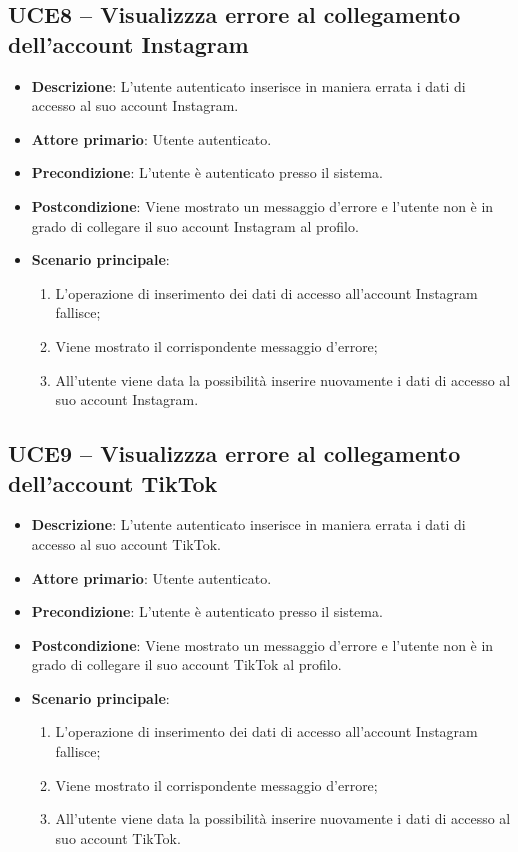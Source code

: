 \subsection{UCE8 – Visualizzza errore al collegamento dell'account Instagram}
\begin{itemize}
\item \textbf{Descrizione}: L'utente autenticato inserisce in maniera errata i dati di accesso al suo account Instagram.
\item \textbf{Attore primario}: Utente autenticato.
\item \textbf{Precondizione}: L'utente è autenticato presso il sistema.
\item \textbf{Postcondizione}: Viene mostrato un messaggio d'errore e l'utente non è in grado di collegare il suo account Instagram al profilo.

\item \textbf{Scenario principale}:
\begin{enumerate}
\item L'operazione di inserimento dei dati di accesso all'account Instagram fallisce;
\item Viene mostrato il corrispondente messaggio d'errore;
\item All'utente viene data la possibilità inserire nuovamente i dati di accesso al suo account Instagram.
\end{enumerate}
\end{itemize}

\subsection{UCE9 – Visualizzza errore al collegamento dell'account TikTok}
\begin{itemize}
\item \textbf{Descrizione}: L'utente autenticato inserisce in maniera errata i dati di accesso al suo account TikTok.
\item \textbf{Attore primario}: Utente autenticato.
\item \textbf{Precondizione}: L'utente è autenticato presso il sistema.
\item \textbf{Postcondizione}: Viene mostrato un messaggio d'errore e l'utente non è in grado di collegare il suo account TikTok al profilo.

\item \textbf{Scenario principale}:
\begin{enumerate}
\item L'operazione di inserimento dei dati di accesso all'account Instagram fallisce;
\item Viene mostrato il corrispondente messaggio d'errore;
\item All'utente viene data la possibilità inserire nuovamente i dati di accesso al suo account TikTok.
\end{enumerate}
\end{itemize}